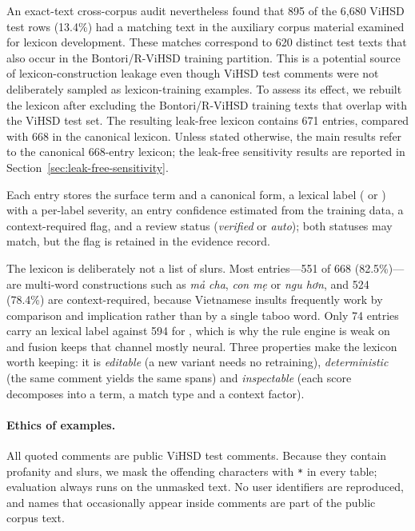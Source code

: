 An exact-text cross-corpus audit nevertheless found that 895 of the 6{,}680
ViHSD test rows (13.4\%) had a matching text in the auxiliary corpus material
examined for lexicon development. These matches correspond to 620 distinct test
texts that also occur in the Bontori/R-ViHSD training partition. This is a
potential source of lexicon-construction leakage even though ViHSD test
comments were not deliberately sampled as lexicon-training examples. To assess
its effect, we rebuilt the lexicon after excluding the Bontori/R-ViHSD training
texts that overlap with the ViHSD test set. The resulting leak-free lexicon
contains 671 entries, compared with 668 in the canonical lexicon. Unless stated
otherwise, the main results refer to the canonical 668-entry lexicon; the
leak-free sensitivity results are reported in
Section~\ref{sec:leak-free-sensitivity}.

Each entry stores the surface term and a canonical form, a lexical label
(\hate{} or \off{}) with a per-label severity, an entry confidence estimated
from the training data, a context-required flag, and a review status
(\emph{verified} or \emph{auto}); both statuses may match, but the flag is
retained in the evidence record.

The lexicon is deliberately not a list of slurs. Most entries---551 of 668
(82.5\%)---are multi-word constructions such as \emph{mả cha}, \emph{con mẹ} or
\emph{ngu hơn}, and 524 (78.4\%) are context-required, because Vietnamese
insults frequently work by comparison and implication rather than by a single
taboo word. Only 74 entries carry an \off{} lexical label against 594 for
\hate{}, which is why the rule engine is weak on \off{} and fusion keeps that
channel mostly neural. Three properties make the lexicon worth keeping: it is
\emph{editable} (a new variant needs no retraining), \emph{deterministic} (the
same comment yields the same spans) and \emph{inspectable} (each score
decomposes into a term, a match type and a context factor).

\paragraph{Ethics of examples.}
All quoted comments are public ViHSD test comments. Because they contain
profanity and slurs, we mask the offending characters with \texttt{*} in every
table; evaluation always runs on the unmasked text. No user identifiers are
reproduced, and names that occasionally appear inside comments are part of the
public corpus text.